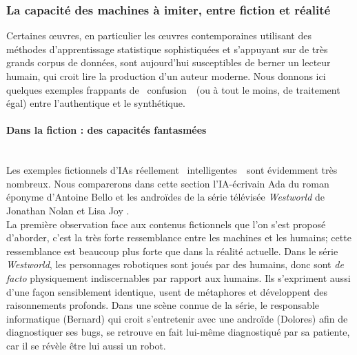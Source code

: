 \documentclass{article}
\newcommand{\subsubsubsection}[1]{\paragraph{#1}\mbox{}\\}
\begin{document}
			\subsubsection{La capacité des machines à imiter, entre fiction et réalité}\label{fiction_vs_realite}
				Certaines œuvres, en particulier les œuvres contemporaines utilisant des méthodes d'apprentissage statistique sophistiquées et s'appuyant sur de très grands corpus de données, sont aujourd'hui susceptibles de berner un lecteur humain, qui croit lire la production d'un auteur moderne. Nous donnons ici quelques exemples frappants de \guillemotleft~confusion~\guillemotright~(ou à tout le moins, de traitement égal) entre l'authentique et le synthétique.
				\subsubsubsection{Dans la fiction : des capacités fantasmées}
					Les exemples fictionnels d'IAs réellement \guillemotleft~intelligentes~\guillemotright~sont évidemment très nombreux. Nous comparerons dans cette section l'IA-écrivain Ada du roman éponyme d'Antoine Bello \autocite{bello2016} et les androïdes de la série télévisée \textit{Westworld} de Jonathan Nolan et Lisa Joy \autocite{westworld}.\\
					
					La première observation face aux contenus fictionnels que l'on s'est proposé d'aborder, c'est la très forte ressemblance entre les machines et les humains; cette ressemblance est beaucoup plus forte que dans la réalité actuelle. Dans le série \textit{Westworld}, les personnages robotiques sont joués par des humains, donc sont \textit{de facto} physiquement indiscernables par rapport aux humains. Ils s'expriment aussi d'une façon sensiblement identique, usent de métaphores et développent des raisonnements profonds. Dans une scène connue de la série, le responsable informatique (Bernard) qui croit s'entretenir avec une androïde (Dolores) afin de diagnostiquer ses bugs, se retrouve en fait lui-même diagnostiqué par sa patiente, car il se révèle être lui aussi un robot.\\
					
\end{document}

